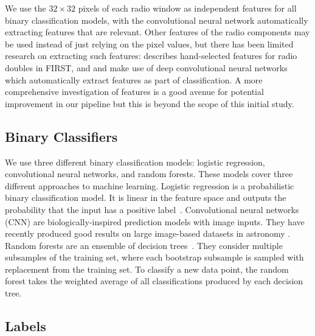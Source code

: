     We use the $32 \times 32$ pixels of each radio window as independent
    features for all binary classification models, with the convolutional neural
    network automatically extracting features that are relevant. Other
    features of the radio components may be used instead of just relying on the pixel values,
    but there has been limited research on extracting such features:
    \citet{proctor06} describes hand-selected features for radio doubles in
    FIRST, and \citet{aniyan17cnn} and \citet{lukic18compact} make use of
    deep convolutional neural networks which automatically extract features as
    part of classification. A more comprehensive investigation of features is
    a good avenue for potential improvement in our pipeline but this is beyond
    the scope of this initial study.

  \subsection{Binary Classifiers}\label{sec:atlas-xid-classifiers}

    We use three different binary classification models: logistic regression,
    convolutional neural networks, and random forests. These models cover
    three different approaches to machine learning. Logistic regression is a
    probabilistic binary classification model. It is linear in the feature
    space and outputs the probability that the input has a positive
    label~\citep[Chap. 4]{bishop06ml}. Convolutional neural networks (CNN) are
    biologically-inspired prediction models with image inputs.
    They have recently produced good results on large image-based datasets in
    astronomy \citep[e.g.]{lukic18compact, dieleman15cnn}. Random
    forests are an ensemble of decision trees~\citep{breiman01random-forest}.
    They consider multiple subsamples of the training set, where each
    bootstrap subsample is sampled with replacement from the training set. To
    classify a new data point, the random forest takes the weighted average of
    all classifications produced by each decision tree.

  \subsection{Labels}\label{sec:atlas-xid-labels}

